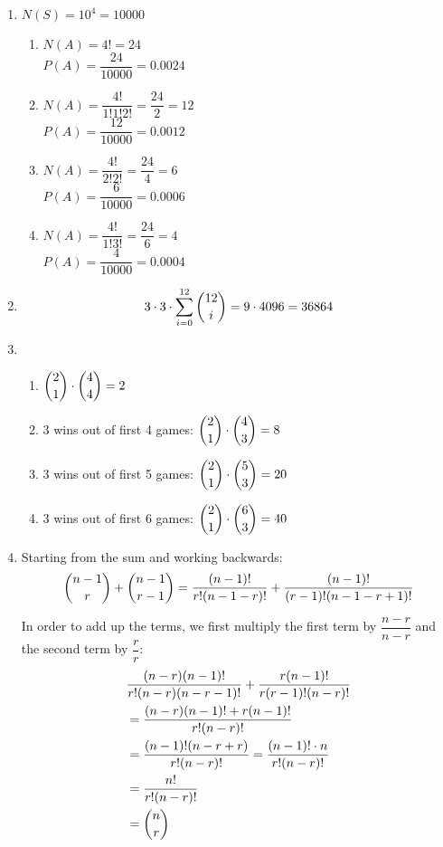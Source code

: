 \documentclass{article}
\begin{document}
\begin{enumerate}
      \item 
	$N(S) = 10^4 = 10000$ 	
	\begin{enumerate}
	 \item 
	    $N(A) = 4! = 24$ \\
	    $P(A) = \dfrac{24}{10000} = 0.0024$
	 \item	    
	    $N(A) = \dfrac{4!}{1!1!2!} = \dfrac{24}{2} = 12$ \\
	    $P(A) = \dfrac{12}{10000} = 0.0012$
	 \item
	    $N(A) = \dfrac{4!}{2!2!} = \dfrac{24}{4} = 6$ \\
	    $P(A) = \dfrac{6}{10000} = 0.0006$
	 \item
	    $N(A) = \dfrac{4!}{1!3!} = \dfrac{24}{6} = 4$ \\
	    $P(A) = \dfrac{4}{10000} = 0.0004$
	\end{enumerate}

      \item 
	$$ 3\cdot3\cdot\sum_{i=0}^{12}{\dbinom{12}{i}} = 9 \cdot 4096 = 36864 $$
	
      \item
	\begin{enumerate}
	 \item $\dbinom{2}{1} \cdot \dbinom{4}{4} = 2$
	 \item 3 wins out of first 4 games: $\dbinom{2}{1} \cdot \dbinom{4}{3} = 8$
	 \item 3 wins out of first 5 games: $\dbinom{2}{1} \cdot \dbinom{5}{3} = 20$
	 \item 3 wins out of first 6 games: $\dbinom{2}{1} \cdot \dbinom{6}{3} = 40$
	\end{enumerate}

      \item
	Starting from the sum and working backwards:
	\begin{align*}
	 \dbinom{n-1}{r} + \dbinom{n-1}{r-1} = \dfrac{(n-1)!}{r!(n-1-r)!} + \dfrac{(n-1)!}{(r-1)!(n-1-r+1)!}
	\end{align*}
	
	In order to add up the terms, we first multiply the first term by $\dfrac{n-r}{n-r}$ and the second
	term by $\dfrac{r}{r}$:	
	\begin{align*}
	 &\dfrac{(n-r)(n-1)!}{r!(n-r)(n-r-1)!} + \dfrac{r(n-1)!}{r(r-1)!(n-r)!} \\
	 &= \dfrac{(n-r)(n-1)! + r(n-1)!}{r!(n-r)!} \\
	 &= \dfrac{(n-1)!(n-r+r)}{r!(n-r)!} = \dfrac{(n-1)!\cdot n}{r!(n-r)!} \\
	 &= \dfrac{n!}{r!(n-r)!} \\
	 &= \dbinom{n}{r}
	\end{align*}
      

\end{enumerate}
\end{document}
